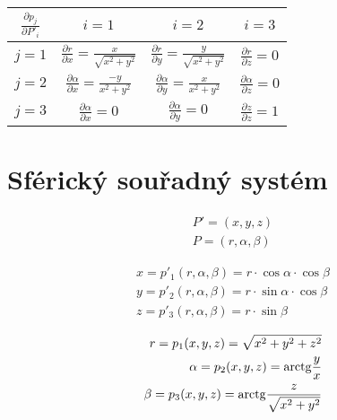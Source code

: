 \begin{tabular}{| c || c | c | c |}
\hline
\(\frac{\partial p_j}{\partial P'_i}\) & \(i=1\) & \(i=2\) & \(i=3\)\\
\hline
\hline
\(j=1\) & \(\frac{\partial r}{\partial x} = \frac{x}{\sqrt{x^2 + y^2}}\) & \(\frac{\partial r}{\partial y} = \frac{y}{\sqrt{x^2 + y^2}}\) & \(\frac{\partial r}{\partial z} = 0\)\\
\hline
\(j=2\) & \(\frac{\partial \alpha}{\partial x} = \frac{-y}{x^2 + y^2}\) & \(\frac{\partial \alpha}{\partial y} = \frac{x}{x^2 + y^2}\) & \(\frac{\partial \alpha}{\partial z} = 0\)\\
\hline
\(j=3\) & \(\frac{\partial \alpha}{\partial x} = 0\) & \(\frac{\partial \alpha}{\partial y} = 0\) & \(\frac{\partial z}{\partial z} = 1\)\\
\hline
\end{tabular}

\section{Sférický souřadný systém}

\begin{equation}
\begin{split}
P' = (x, y, z) \\
P = (r, \alpha, \beta)
\end{split}
\end{equation}

\begin{equation}
\begin{split}
x = p'_1(r, \alpha, \beta) = r \cdot \cos \alpha \cdot \cos \beta \\
y = p'_2(r, \alpha, \beta) = r \cdot \sin \alpha \cdot \cos \beta \\
z = p'_3(r, \alpha, \beta) = r \cdot \sin \beta
\end{split}
\end{equation}

\begin{equation}
\begin{split}
r = p_1(x, y, z) = \sqrt{x^2 + y^2 + z^2} \\
\alpha = p_2(x, y, z) = \mathrm{arctg} \frac{y}{x} \\
\beta = p_3(x, y, z) = \mathrm{arctg} \frac{z}{\sqrt{x^2 + y^2}}
\end{split}
\end{equation}

